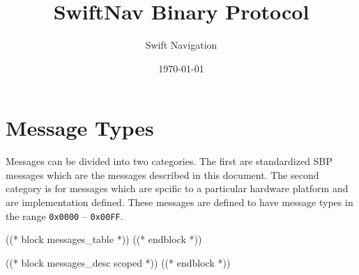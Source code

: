 \documentclass{article}
\title{SwiftNav Binary Protocol}
\author{Swift Navigation}
\date{\today}
\numberwithin{table}{subsection}
\numberwithin{field}{subsection}
\begin{document}
\maketitle

\thispagestyle{firstpage}

\section{Message Types}
\label{sec:Messages}

Messages can be divided into two categories. The first are standardized SBP
messages which are the messages described in this document. The second category
is for messages which are spcific to a particular hardware platform and are
implementation defined. These messages are defined to have message types in the
range \texttt{0x0000} -- \texttt{0x00FF}.

((* block messages_table *))
((* endblock *))


((* block messages_desc scoped *))
((* endblock *))
\end{document}
